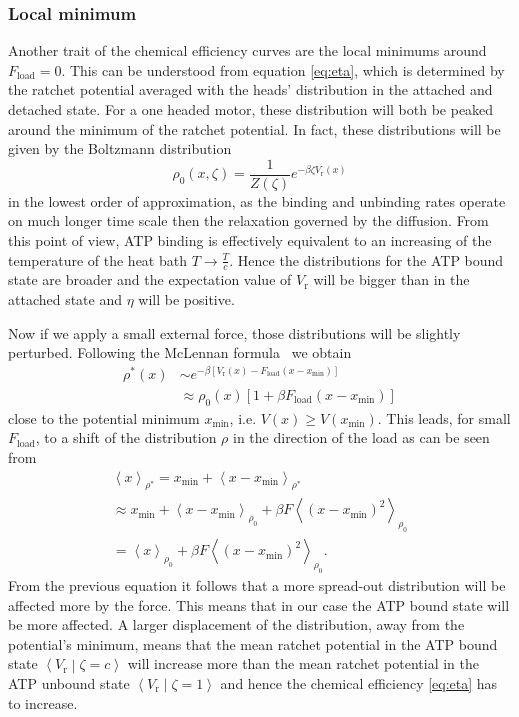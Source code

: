 \documentclass[aps,pre,twocolumn,showpacs,showkeys,superscriptaddress,floatfix]{revtex4-1}
\begin{document}
\subsubsection{Local minimum}
Another trait of the chemical efficiency curves are the local minimums around $F_\text{load}=0$. 
This can be understood from equation \eqref{eq:eta}, which is determined by the ratchet potential averaged with the heads' distribution in the attached and detached state. 
For a one headed motor, these distribution will both be peaked around the minimum of the ratchet potential. 
In fact, these distributions will be given by the Boltzmann distribution
\begin{equation}
\rho_0(x,\zeta) = \frac{1}{Z(\zeta)} e^{-\beta \zeta V_\text{r}(x)}
\end{equation} 
in the lowest order of approximation, as the binding and unbinding rates operate on much longer time scale then the relaxation governed by the diffusion. 
From this point of view, ATP binding is effectively equivalent to an increasing of the temperature of the heat bath $T\rightarrow\frac{T}{c}$. 
Hence the distributions for the ATP bound state are broader and the expectation value of $V_\text{r}$ will be bigger than in the attached state and $\eta$ will be positive. 

Now if we apply a small external force, those distributions will be slightly perturbed. 
Following the McLennan formula~\cite{} we obtain %
\begin{align*}
\rho^*(x) 
&\sim e^{-\beta \left[V_\text{r}(x) - F_\text{load} \left( x - x_\text{min} \right) \right]} \\
&\approx \rho_0(x) \left[1 + \beta F_\text{load} \left( x - x_\text{min} \right) \right]
\end{align*}
close to the potential minimum $x_\text{min}$, i.e. $V(x) \ge V(x_\text{min})$. 
This leads, for small $F_\text{load}$, to a shift of the distribution $\rho$ in the direction of the load
as can be seen from 
\begin{multline}
\left\langle x \right\rangle_{\rho^*} 
= x_\text{min} + \left\langle x - x_\text{min} \right\rangle_{\rho^*}
\\
\approx x_\text{min} + \left\langle x - x_\text{min} \right\rangle_{\rho_0} 
+ \beta F \left\langle \left( x - x_\text{min} \right)^2 \right\rangle_{\rho_0} 
\\
= \left\langle x \right\rangle_{\rho_0}
+ \beta F \left\langle \left( x - x_\text{min} \right)^2 \right\rangle_{\rho_0} .
\label{eq:mean_position_shift}
\end{multline}
From the previous equation it follows that a more spread-out distribution will be affected more by the force.
This means that in our case the ATP bound state will be more affected.
A larger displacement of the distribution, away from the potential's minimum, 
means that the mean ratchet potential in the ATP bound state $\left\langle V_\text{r} \middle| \zeta = c \right\rangle$ will increase more than the mean ratchet potential in the ATP unbound state $\left\langle V_\text{r} \middle| \zeta = 1 \right\rangle$ and hence the chemical efficiency \eqref{eq:eta} has to increase. 
\end{document}
